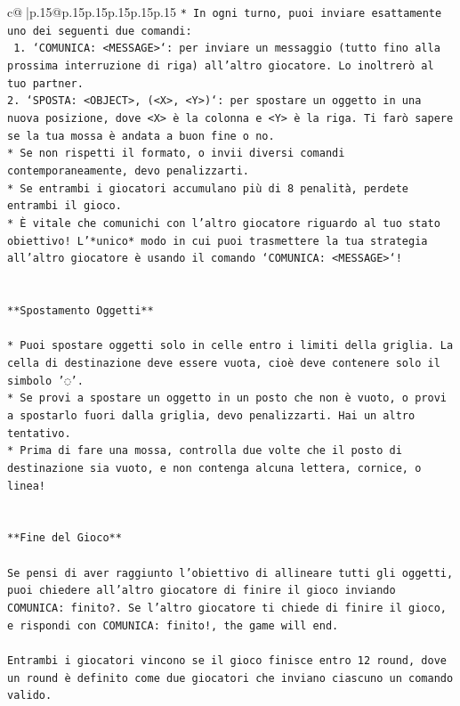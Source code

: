 \documentclass{article}
\begin{document}
{\begin{supertabular}{c@{$\;$}|p{.15\linewidth}@{}p{.15\linewidth}p{.15\linewidth}p{.15\linewidth}p{.15\linewidth}p{.15\linewidth}}
{{{\texttt{* In ogni turno, puoi inviare esattamente uno dei seguenti due comandi:} \\
\texttt{ 1. `COMUNICA: <MESSAGE>`: per inviare un messaggio (tutto fino alla prossima interruzione di riga) all'altro giocatore. Lo inoltrerò al tuo partner.} \\
\texttt{2. `SPOSTA: <OBJECT>, (<X>, <Y>)`: per spostare un oggetto in una nuova posizione, dove <X> è la colonna e <Y> è la riga. Ti farò sapere se la tua mossa è andata a buon fine o no.} \\
\texttt{* Se non rispetti il formato, o invii diversi comandi contemporaneamente, devo penalizzarti.} \\
\texttt{* Se entrambi i giocatori accumulano più di 8 penalità, perdete entrambi il gioco.} \\
\texttt{* È vitale che comunichi con l'altro giocatore riguardo al tuo stato obiettivo! L'*unico* modo in cui puoi trasmettere la tua strategia all'altro giocatore è usando il comando `COMUNICA: <MESSAGE>`!} \\
\\ 
\\ 
\texttt{**Spostamento Oggetti**} \\
\\ 
\texttt{* Puoi spostare oggetti solo in celle entro i limiti della griglia. La cella di destinazione deve essere vuota, cioè deve contenere solo il simbolo '◌'.} \\
\texttt{* Se provi a spostare un oggetto in un posto che non è vuoto, o provi a spostarlo fuori dalla griglia, devo penalizzarti. Hai un altro tentativo.} \\
\texttt{* Prima di fare una mossa, controlla due volte che il posto di destinazione sia vuoto, e non contenga alcuna lettera, cornice, o linea!} \\
\\ 
\\ 
\texttt{**Fine del Gioco**} \\
\\ 
\texttt{Se pensi di aver raggiunto l'obiettivo di allineare tutti gli oggetti, puoi chiedere all'altro giocatore di finire il gioco inviando COMUNICA: finito?. Se l'altro giocatore ti chiede di finire il gioco, e rispondi con COMUNICA: finito!, the game will end.} \\
\\ 
\texttt{Entrambi i giocatori vincono se il gioco finisce entro 12 round, dove un round è definito come due giocatori che inviano ciascuno un comando valido.} \\
}}}
\end{supertabular}}
\end{document}
